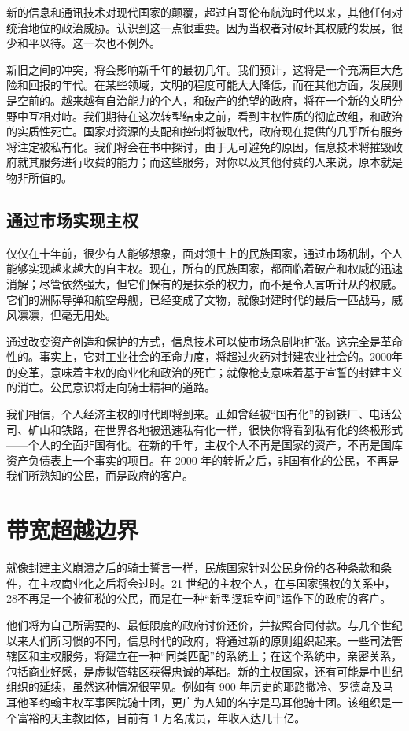 新的信息和通讯技术对现代国家的颠覆，超过自哥伦布航海时代以来，其他任何对统治地位的政治威胁。认识到这一点很重要。因为当权者对破坏其权威的发展，很少和平以待。这一次也不例外。


新旧之间的冲突，将会影响新千年的最初几年。我们预计，这将是一个充满巨大危险和回报的年代。在某些领域，文明的程度可能大大降低，而在其他方面，发展则是空前的。越来越有自治能力的个人，和破产的绝望的政府，将在一个新的文明分野中互相对峙。我们期待在这次转型结束之前，看到主权性质的彻底改组，和政治的实质性死亡。国家对资源的支配和控制将被取代，政府现在提供的几乎所有服务将注定被私有化。我们将会在书中探讨，由于无可避免的原因，信息技术将摧毁政府就其服务进行收费的能力；而这些服务，对你以及其他付费的人来说，原本就是物非所值的。


\subsection{通过市场实现主权}
仅仅在十年前，很少有人能够想象，面对领土上的民族国家，通过市场机制，个人能够实现越来越大的自主权。现在，所有的民族国家，都面临着破产和权威的迅速消解；尽管依然强大，但它们保有的是抹杀的权力，而不是令人言听计从的权威。它们的洲际导弹和航空母舰，已经变成了文物，就像封建时代的最后一匹战马，威风凛凛，但毫无用处。


通过改变资产创造和保护的方式，信息技术可以使市场急剧地扩张。这完全是革命性的。事实上，它对工业社会的革命力度，将超过火药对封建农业社会的。2000年的变革，意味着主权的商业化和政治的死亡；就像枪支意味着基于宣誓的封建主义的消亡。公民意识将走向骑士精神的道路。


我们相信，个人经济主权的时代即将到来。正如曾经被“国有化”的钢铁厂、电话公司、矿山和铁路，在世界各地被迅速私有化一样，很快你将看到私有化的终极形式——个人的全面非国有化。在新的千年，主权个人不再是国家的资产，不再是国库资产负债表上一个事实的项目。在 2000 年的转折之后，非国有化的公民，不再是我们所熟知的公民，而是政府的客户。


\section{带宽超越边界}
就像封建主义崩溃之后的骑士誓言一样，民族国家针对公民身份的各种条款和条件，在主权商业化之后将会过时。21 世纪的主权个人，在与国家强权的关系中，28不再是一个被征税的公民，而是在一种“新型逻辑空间”运作下的政府的客户。


他们将为自己所需要的、最低限度的政府讨价还价，并按照合同付款。与几个世纪以来人们所习惯的不同，信息时代的政府，将通过新的原则组织起来。一些司法管辖区和主权服务，将建立在一种“同类匹配”的系统上；在这个系统中，亲密关系，包括商业好感，是虚拟管辖区获得忠诚的基础。新的主权国家，还有可能是中世纪组织的延续，虽然这种情况很罕见。例如有 900 年历史的耶路撒冷、罗德岛及马耳他圣约翰主权军事医院骑士团，更广为人知的名字是马耳他骑士团。该组织是一个富裕的天主教团体，目前有 1 万名成员，年收入达几十亿。


